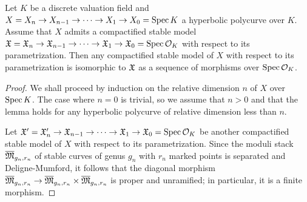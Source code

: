 \begin{lem}
  Let $K$ be a discrete valuation field and $X = X_n \to X_{n - 1} \to \cdots \to X_1 \to X_0 = \mathrm{Spec} \, K$ a hyperbolic polycurve over $K$. Assume that $X$ admits a compactified stable model $\mathfrak{X} = \mathfrak{X}_n \to \mathfrak{X}_{n - 1} \to \cdots \to \mathfrak{X}_1 \to \mathfrak{X}_0 = \mathrm{Spec} \, \mathcal{O}_K$ with respect to its parametrization. Then any compactified stable model of $X$ with respect to its parametrization is isomorphic to $\mathfrak{X}$ as a sequence of morphisms over $\mathrm{Spec} \, \mathcal{O}_K$.
\end{lem}
\begin{proof}
  We shall proceed by induction on the relative dimension $n$ of $X$ over $\mathrm{Spec} \, K$. The case where $n = 0$ is trivial, so we assume that $n > 0$ and that the lemma holds for any hyperbolic polycurve of relative dimension less than $n$.

  Let $\mathfrak{X}' = \mathfrak{X}'_n \to \mathfrak{X}_{n - 1} \to \cdots \to \mathfrak{X}_1 \to \mathfrak{X}_0 = \mathrm{Spec} \, \mathcal{O}_K$ be another compactified stable model of $X$ with respect to its parametrization. Since the moduli stack $\overline{\mathfrak{M}}_{g_n, r_n}$ of stable curves of genus $g_n$ with $r_n$ marked points is separated and Deligne-Mumford, it follows that the diagonal morphism $\overline{\mathfrak{M}}_{g_n, r_n} \to \overline{\mathfrak{M}}_{g_n, r_n} \times \overline{\mathfrak{M}}_{g_n, r_n}$ is proper and unramified; in particular, it is a finite morphism.


\end{proof}
